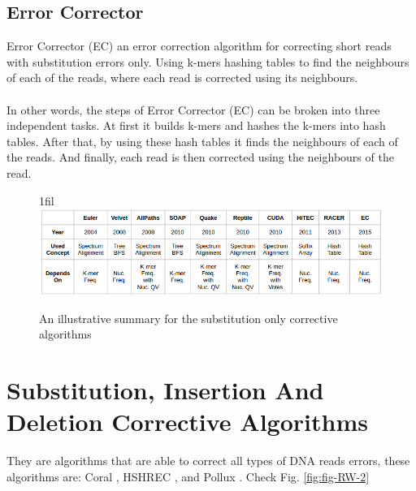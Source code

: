 \documentclass[12pt,openany]{llncs}
\makeatletter
\newcommand*{\centerfloat}{%
  \parindent \z@
  \leftskip \z@ \@plus 1fil \@minus \textwidth
  \rightskip\leftskip
  \parfillskip \z@skip}
\makeatother
\begin{document}
\subsection{Error Corrector}
Error Corrector (EC) \cite{EC} an error correction algorithm for correcting short reads with substitution errors only. Using k-mers hashing tables to find the neighbours of each of the reads, where each read is corrected using its neighbours.
\\
\\
In other words, the steps of Error Corrector (EC) can be broken into three independent tasks. At first it builds k-mers and hashes the k-mers into hash tables. After that, by using these hash tables it finds the neighbours of each of the reads. And finally, each read is then corrected using the neighbours of the read.

\begin{figure}
	\centerfloat
	\includegraphics[width=1.35\linewidth]{./figs/RW-1}
	\caption{\label{fig:fig-RW-1}An illustrative summary for the substitution only corrective algorithms}
\end{figure}


\section{Substitution, Insertion And Deletion Corrective Algorithms}
They are algorithms that are able to correct all types of DNA reads errors, these algorithms are: Coral \cite{Coral}, HSHREC \cite{HShrec}, and Pollux \cite{Pollux}. Check Fig. \ref{fig:fig-RW-2}
\end{document}
